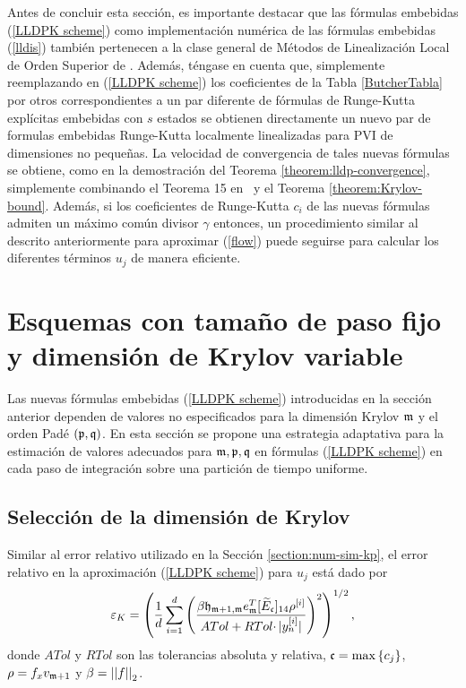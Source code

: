 Antes de concluir esta sección, es importante destacar que las fórmulas embebidas (\ref{LLDPK scheme}) como implementación numérica de las fórmulas embebidas (\ref{lldis}) también pertenecen a la clase general de Métodos de Linealización Local de Orden Superior de \cite{Jimenez13}. Además, téngase en cuenta que, simplemente reemplazando en (\ref{LLDPK scheme}) los coeficientes de la Tabla \ref{ButcherTabla} por otros correspondientes a un par diferente de fórmulas de Runge-Kutta explícitas embebidas con $s$ estados se obtienen directamente un nuevo par de formulas embebidas Runge-Kutta localmente linealizadas para PVI de dimensiones no pequeñas. La velocidad de convergencia de tales nuevas fórmulas se obtiene, como en la demostración del Teorema \ref{theorem:lldp-convergence}, simplemente combinando el Teorema 15 en~\cite{Jimenez13} y el Teorema \ref{theorem:Krylov-bound}. Además, si los coeficientes de Runge-Kutta $c_i$ de las nuevas fórmulas admiten un máximo común divisor $\gamma$ entonces, un procedimiento similar al descrito anteriormente para aproximar (\ref{flow}) puede seguirse para calcular los diferentes términos $u_j$ de manera eficiente.

\section{Esquemas con tamaño de paso fijo y dimensión de Krylov variable}\label{section:lldp-fix-step}

Las nuevas fórmulas embebidas (\ref{LLDPK scheme}) introducidas en la sección anterior dependen de valores no especificados para la dimensión Krylov $\mathfrak{m}$ y el orden Padé $(\mathfrak{p} ,\mathfrak{q})$. En esta sección se propone una estrategia adaptativa para la estimación de valores adecuados para $\mathfrak{m}, \mathfrak{p} ,\mathfrak{q}$ en fórmulas (\ref{LLDPK scheme}) en cada paso de integración sobre una partición de tiempo uniforme.

\subsection{Selección de la dimensión de Krylov}\label{sec:selkrydim}

Similar al error relativo utilizado en la Sección \ref{section:num-sim-kp}, el error relativo en la aproximación (\ref{LLDPK scheme}) para $u_j$ está dado por
\begin{equation}
    \varepsilon_{K} = \left(\frac{1}{d}\sum\limits_{i=1}^{d} \left(\frac{\beta
        \mathfrak{h}_{\mathfrak{m}+1,\mathfrak{m}} e_{\mathfrak{m}}^T
        [\widetilde{E}_\mathfrak{c}]_{14} \rho^{[i]}}{ATol+ RTol\cdotp
        \rvert y_{n}^{[i]}\rvert}\right)^{2}\right)^{1/2},
    \label{errrel}
\end{equation}
donde $ATol$ y $RTol$ son las tolerancias absoluta y relativa, $\mathfrak{c}=\max\left\{ c_j \right\}$, $\rho = f_x v_{\mathfrak{m}+1}$ y $\beta=\left\lvert \left\lvert f \right\rvert \right\rvert_2$.


